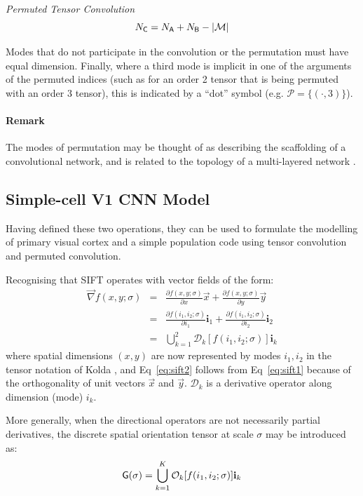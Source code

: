 \begin{definition}{\textit{Permuted Tensor Convolution}}
\begin{equation}
N_{\mathsf{C}} = N_{\mathsf{A}} + N_{\mathsf{B}} - |\mathcal{M}| 
\end{equation}

Modes that do not participate in the convolution or the permutation must have equal dimension. Finally, where a third mode is implicit in one of the arguments of the permuted indices (such as for an order 2 tensor that is being permuted with an order 3 tensor), this is indicated by a ``dot'' symbol (e.g. $\mathcal{P} = \lbrace (\cdot,3)\rbrace$).

\paragraph{Remark} The modes of permutation may be thought of as describing the scaffolding of a convolutional network, and is related to the topology of a multi-layered network \cite{chang2015deep}. 


\end{definition}


\subsection{Simple-cell V1 CNN Model}


Having defined these two operations, they can be used to formulate the modelling of primary visual cortex and a simple population code using tensor convolution and permuted convolution. 

Recognising that SIFT operates with vector fields of the form:
\begin{eqnarray}
\label{eq:sift1}
\vec{\nabla} f(x,y;\sigma) &=& \frac{\partial f(x,y;\sigma)}{\partial x}\vec{x} + \frac{\partial f(x,y;\sigma)}{\partial y}\vec{y}\nonumber \\
&=& \frac{\partial f(i_1,i_2;\sigma)}{\partial i_1}\mathbf{i}_1 + \frac{\partial f(i_1,i_2;\sigma)}{\partial i_2}\mathbf{i}_2\\
\label{eq:sift2}
&=& \bigcup_{k=1}^2 \mathcal{D}_k [ f(i_1,i_2;\sigma) ] \mathbf{i}_k 
\end{eqnarray}
where spatial dimensions $(x,y)$ are now represented by modes $i_1,i_2$ in the tensor notation of Kolda \citep{kolda2009tensor}, and Eq~\ref{eq:sift2} follows from Eq~\ref{eq:sift1} because of the orthogonality of unit vectors $\vec{x}$ and $\vec{y}$.  $\mathcal{D}_k$ is a derivative operator along dimension (mode) $i_k$. 

More generally, when the directional operators are not necessarily partial derivatives, the discrete spatial orientation tensor at scale $\sigma$ may be introduced as:
\begin{equation}
\mathsf{G(\sigma)}  = \bigcup_{k=1}^K \mathcal{O}_k [ f(i_1,i_2;\sigma) ] \mathbf{i}_k 
\label{eq:IntroG}
\end{equation}

